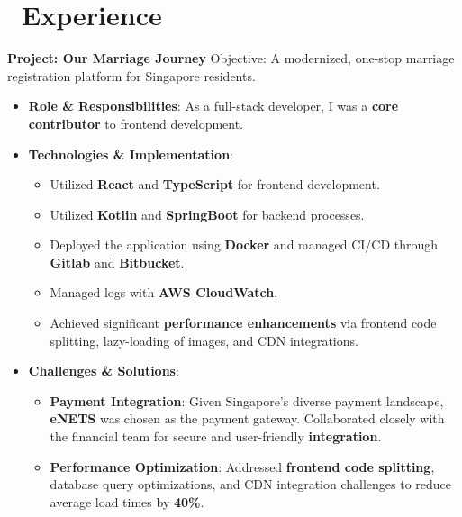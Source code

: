 \documentclass{resume}
\begin{document}



  \section{\faUsers\ Experience}
  \role{Software Developer}
  
  \textbf{Project: Our Marriage Journey}
  Objective: A modernized, one-stop marriage registration platform for Singapore residents.
  \begin{itemize}
    \item \textbf{Role \& Responsibilities}: As a full-stack developer, I was a \textbf{core contributor} to frontend development.
    \item \textbf{Technologies \& Implementation}:
      \begin{itemize}
        \item Utilized \textbf{React} and \textbf{TypeScript} for frontend development.
        \item Utilized \textbf{Kotlin} and \textbf{SpringBoot} for backend processes.
        \item Deployed the application using \textbf{Docker} and managed CI/CD through \textbf{Gitlab} and \textbf{Bitbucket}.
        \item Managed logs with \textbf{AWS CloudWatch}.
        \item Achieved significant \textbf{performance enhancements} via frontend code splitting, lazy-loading of images, and CDN integrations.
      \end{itemize}
    \item \textbf{Challenges \& Solutions}:
      \begin{itemize}
        \item \textbf{Payment Integration}: Given Singapore's diverse payment landscape, \textbf{eNETS} was chosen as the payment gateway. Collaborated closely with the financial team for secure and user-friendly \textbf{integration}.
        \item \textbf{Performance Optimization}: Addressed \textbf{frontend code splitting}, database query optimizations, and CDN integration challenges to reduce average load times by \textbf{40\%}.

\end{itemize}
\end{itemize}
\end{document}
